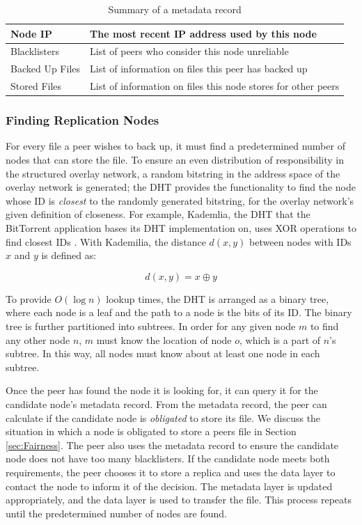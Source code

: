 \documentclass[12pt]{report}
\begin{document}
\begin{table}
\begin{center}
    \begin{tabular}{| l | l |}
    \hline
    Node IP & The most recent IP address used by this node\\ \hline
    Blacklisters & List of peers who consider this node unreliable\\ \hline
    Backed Up Files & List of information on files this peer has backed up \\ \hline
    Stored Files & List of information on files this node stores for other peers \\ \hline
    \end{tabular}
    \caption{Summary of a metadata record}
    \label{tab:metadataRecord}
\end{center}
\end{table}

\subsubsection{Finding Replication Nodes} \label{subsubsec:FindingReplicationNodes}

For every file a peer wishes to back up, it must find a predetermined number of nodes that can store the file. To ensure an even distribution of responsibility in the structured overlay network, a random bitstring in the address space of the overlay network is generated; the DHT provides the functionality to find the node whose ID is \textit{closest} to the randomly generated bitstring, for the overlay network's given definition of closeness. For example, Kademlia, the DHT that the BitTorrent application bases its DHT implementation on, uses XOR operations to find closest IDs \cite{kademliaDHT}. With Kademilia, the distance $d(x,y)$ between nodes with IDs $x$ and $y$ is defined as:

$$
d(x,y)=x \oplus y
$$

To provide $O(\log n)$ lookup times, the DHT is arranged as a binary tree, where each node is a leaf and the path to a node is the bits of its ID. The binary tree is further partitioned into subtrees. In order for any given node $m$ to find any other node $n$, $m$ must know the location of node $o$, which is a part of $n$'s subtree. In this way, all nodes must know about at least one node in each subtree.

Once the peer has found the node it is looking for, it can query it for the candidate node's metadata record. From the metadata record, the peer can calculate if the candidate node is \textit{obligated} to store its file. We discuss the situation in which a node is obligated to store a peers file in Section \ref{sec:Fairness}. The peer also uses the metadata record to ensure the candidate node does not have too many blacklisters. If the candidate node meets both requirements, the peer chooses it to store a replica and uses the data layer to contact the node to inform it of the decision. The metadata layer is updated appropriately, and the data layer is used to transfer the file. This process repeats until the predetermined number of nodes are found.
\end{document}
